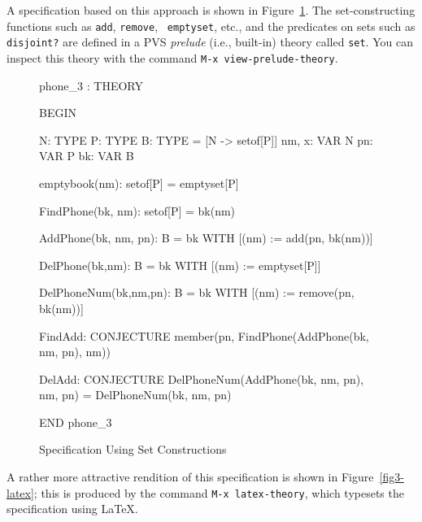A specification based on this approach is shown in Figure~\ref{fig3}.
The set-constructing functions such as {\tt add}, {\tt remove}, {\tt
emptyset}, etc., and the predicates on sets such as {\tt disjoint?}
are defined in a PVS {\em prelude\/} (i.e., built-in)
theory called {\tt set}.  You can inspect this theory with the command
{\tt M-x view-prelude-theory}.
\begin{figure}[htbp]
\begin{jmrsession}
phone_3 : THEORY

  BEGIN

  N: TYPE                     %
  P: TYPE                     %
  B: TYPE = [N -> setof[P]]   %
  nm, x: VAR N
  pn: VAR P
  bk: VAR B
  
  emptybook(nm): setof[P] = emptyset[P]

  FindPhone(bk, nm): setof[P] = bk(nm)

  AddPhone(bk, nm, pn): B = bk WITH [(nm) := add(pn, bk(nm))]

  DelPhone(bk,nm): B = bk WITH [(nm) := emptyset[P]]

  DelPhoneNum(bk,nm,pn): B = bk WITH [(nm) := remove(pn, bk(nm))]

  FindAdd: CONJECTURE member(pn, FindPhone(AddPhone(bk, nm, pn), nm))

  DelAdd: CONJECTURE DelPhoneNum(AddPhone(bk, nm, pn), nm, pn) =
                DelPhoneNum(bk, nm, pn)

  END phone_3
\end{jmrsession}
\caption{\label{fig3}Specification Using Set Constructions}
\end{figure}
A rather more attractive rendition of this specification is shown in
Figure~\ref{fig3-latex}; this is produced by the command {\tt M-x
latex-theory}, which typesets the specification using \LaTeX.

